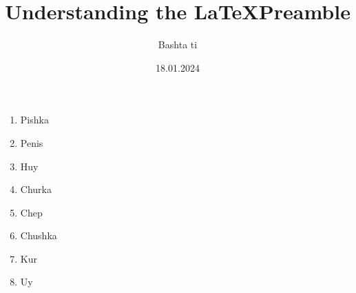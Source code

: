 \documentclass[12pt]{article}
\title{Understanding the \LaTeX Preamble}
\author{Bashta ti}
\date{18.01.2024}
\begin{document}
\maketitle 
\begin{enumerate}
    \item Pishka
    \item Penis
    \item Huy
    \item Churka
    \item Chep
    \item Chushka
    \item Kur
    \item Uy
\end{enumerate}
\end{document}
